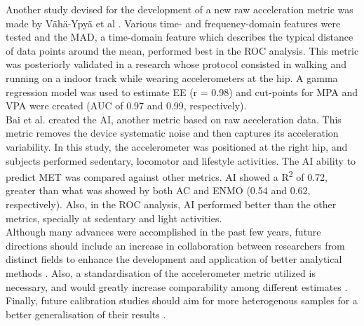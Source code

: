 \documentclass[11pt]{article}
\begin{document}
Another study devised for the development of a new raw acceleration metric was made by V{\"a}h{\"a}-Ypy{\"a} et al \citeyear{Vaha-Ypya_2015}. Various time- and frequency-domain features were tested and the MAD, a time-domain feature which describes the typical distance of data points around the mean, performed best in the ROC analysis. This metric was posteriorly validated in a research \cite{Vaha-Ypya_2015b} whose protocol consisted in walking and running on a indoor track while wearing accelerometers at the hip. A gamma regression model was used to estimate EE (r = 0.98) and cut-points for MPA and VPA were created (AUC of 0.97 and 0.99, respectively). \\

Bai et al. \citeyear{Bai_2016} created the AI, another metric based on raw acceleration data. This metric removes the device systematic noise and then captures its acceleration variability. In this study, the accelerometer was positioned at the right hip, and subjects performed sedentary, locomotor and lifestyle activities. The AI ability to predict MET was compared against other metrics. AI showed a R\textsuperscript{2} of 0.72, greater than what was showed by both AC and ENMO (0.54 and 0.62, respectively). Also, in the ROC analysis, AI performed better than the other metrics, specially at sedentary and light activities. \\

Although many advances were accomplished in the past few years, future directions should include an increase in collaboration between researchers from distinct fields to enhance the development and application of better analytical methods \cite{Mendes_2018, Troiano_2014}. Also, a standardisation of the accelerometer metric utilized is necessary, and would greatly increase comparability among different estimates \cite{Mendes_2018}. Finally, future calibration studies should aim for more heterogenous samples for a better generalisation of their results \cite{Mendes_2018}.

\pagebreak



\end{document}
